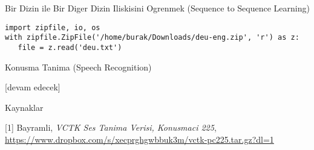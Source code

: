 \documentclass[12pt,fleqn]{article}\usepackage{../../common}
\begin{document}
Bir Dizin ile Bir Diger Dizin Iliskisini Ogrenmek (Sequence to Sequence Learning)

\begin{verbatim}
import zipfile, io, os
with zipfile.ZipFile('/home/burak/Downloads/deu-eng.zip', 'r') as z:
   file = z.read('deu.txt')
\end{verbatim}





















Konusma Tanima (Speech Recognition)












[devam edecek]

Kaynaklar

[1] Bayramli, {\em VCTK Ses Tanima Verisi, Konusmaci 225}, \url{https://www.dropbox.com/s/xecprghgwbbuk3m/vctk-pc225.tar.gz?dl=1}
\end{document}
